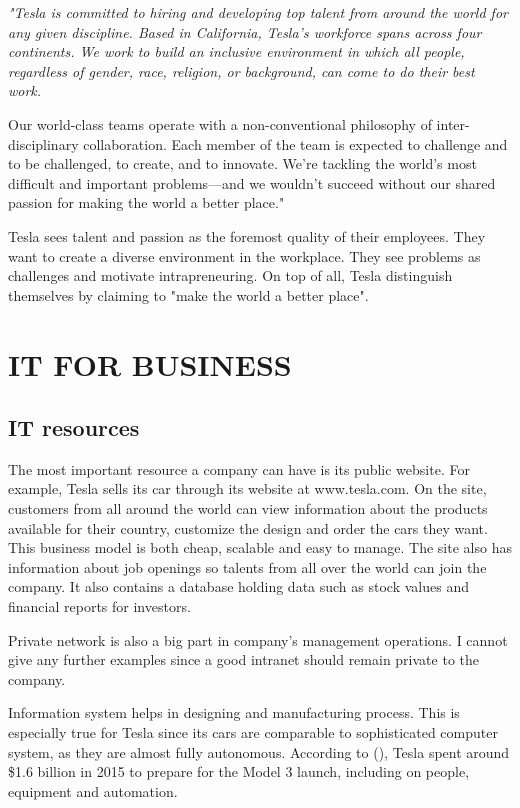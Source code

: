 \documentclass[12pt]{article}
\begin{document}
{\itshape
"Tesla is committed to hiring and developing top talent from around the world for any given discipline. Based in California, Tesla’s workforce spans across four continents. We work to build an inclusive environment in which all people, regardless of gender, race, religion, or background, can come to do their best work.

Our world-class teams operate with a non-conventional philosophy of inter-disciplinary collaboration. Each member of the team is expected to challenge and to be challenged, to create, and to innovate. We’re tackling the world’s most difficult and important problems—and we wouldn’t succeed without our shared passion for making the world a better place."
}

Tesla sees talent and passion as the foremost quality of their employees. They want to create a diverse environment in the workplace. They see problems as challenges and motivate intrapreneuring. On top of all, Tesla distinguish themselves by claiming to "make the world a better place".

\section{IT FOR BUSINESS}

\subsection{IT resources}

The most important resource a company can have is its public website. For example, Tesla sells its car through its website at www.tesla.com. On the site, customers from all around the world can view information about the products available for their country, customize the design and order the cars they want. This business model is both cheap, scalable and easy to manage. The site also has information about job openings so talents from all over the world can join the company. It also contains a database holding data such as stock values and financial reports for investors.

Private network is also a big part in company's management operations. I cannot give any further examples since a good intranet should remain private to the company.

Information system helps in designing and manufacturing process. This is especially true for Tesla since its cars are comparable to sophisticated computer system, as they are almost fully autonomous. According to (\cite{ho16}), Tesla spent around \$1.6 billion in 2015 to prepare for the Model 3 launch, including on people, equipment and automation.
\end{document}
